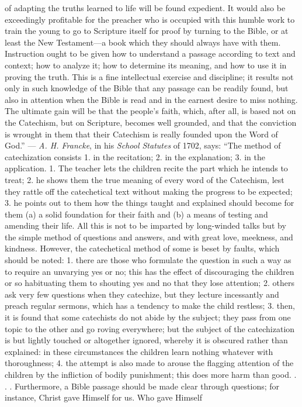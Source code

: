of adapting the truths learned to life will be found expedient. It would also be exceedingly profitable for the preacher who is occupied with this humble work to train the young to go to Scripture itself for proof by turning to the Bible, or at least the New Testament—a book which they should always have with them. Instruction ought to be given how to understand a passage according to text and context; how to analyze it; how to determine its meaning, and how to use it in proving the truth. This is a fine intellectual exercise and discipline; it results not only in such knowledge of the Bible that any passage can be readily found, but also in attention when the Bible is read and in the earnest desire to miss nothing. The ultimate gain will be that the people’s faith, which, after all, is based not on the Catechism, but on Scripture, becomes well grounded, and that the conviction is wrought in them that their Catechism is really founded upon the Word of God.” — \emph{A. H. Francke}, in his \emph{School Statutes} of 1702, says: “The method of catechization consists 1. in the recitation; 2. in the explanation; 3. in the application. 1. The teacher lets the children recite the part which he intends to treat; 2. he shows them the true meaning of every word of the Catechism, lest they rattle off the catechetical text without making the progress to be expected; 3. he points out to them how the things taught and explained should become for them (a) a solid foundation for their faith and (b) a means of testing and amending their life. All this is not to be imparted by long-winded talks but by the simple method of questions and answers, and with great love, meekness, and kindness. However, the catechetical method of some is beset by faults, which should be noted: 1. there are those who formulate the question in such a way as to require an unvarying yes or no; this has the effect of discouraging the children or so habituating them to shouting yes and no that they lose attention; 2. others ask very few questions when they catechize, but they lecture incessantly and preach regular sermons, which has a tendency to make the child restless; 3. then, it is found that some catechists do not abide by the subject; they pass from one topic to the other and go roving everywhere; but the subject of the catechization is but lightly touched or altogether ignored, whereby it is obscured rather than explained: in these circumstances the children learn nothing whatever with thoroughness; 4. the attempt is also made to arouse the flagging attention of the children by the infliction of bodily punishment; this does more harm than good. . . . Furthermore, a Bible passage should be made clear through questions; for instance, Christ gave Himself for us. Who gave Himself
